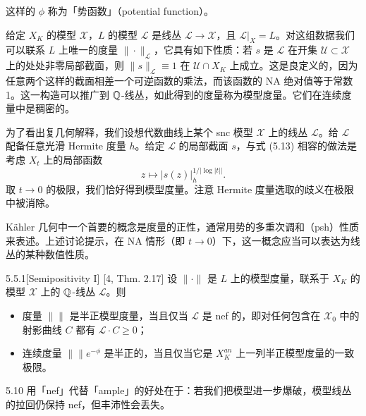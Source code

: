 这样的 $\phi$ 称为「势函数」（potential function）。

给定 $X_K$ 的模型 $\mathcal X$，$L$ 的模型 $\mathcal L$ 是线丛 $\mathcal L\to\mathcal X$，且 $\mathcal L|_X=L$。对这组数据我们可以联系 $L$ 上唯一的度量 $\|\cdot\|_{\mathcal L}$，它具有如下性质：若 $s$ 是 $\mathcal L$ 在开集 $\mathcal U\subset\mathcal X$ 上的处处非零局部截面，则 $\|s\|_{\mathcal L}\equiv 1$ 在 $\mathcal U\cap X_K$ 上成立。这是良定义的，因为任意两个这样的截面相差一个可逆函数的乘法，而该函数的 NA 绝对值等于常数 1。这一构造可以推广到 $\mathbb{Q}$-线丛，如此得到的度量称为模型度量。它们在连续度量中是稠密的。

为了看出复几何解释，我们设想代数曲线上某个 snc 模型 $\mathcal X$ 上的线丛 $\mathcal L$。给 $\mathcal L$ 配备任意光滑 Hermite 度量 $h$。给定 $\mathcal L$ 的局部截面 $s$，与式 (5.13) 相容的做法是考虑 $X_t$ 上的局部函数
\[
z\mapsto |s(z)|^{1/|\log|t||}_h.
\]
取 $t\to 0$ 的极限，我们恰好得到模型度量。注意 Hermite 度量选取的歧义在极限中被消除。


Kähler 几何中一个首要的概念是度量的正性，通常用势的多重次调和（psh）性质来表述。上述讨论提示，在 NA 情形（即 $t\to 0$）下，这一概念应当可以表达为线丛的某种数值性质。

\begin{definition}{5.5.1}[Semipositivity I]
[4, Thm. 2.17] 设 $\|\cdot\|$ 是 $L$ 上的模型度量，联系于 $X_K$ 的模型 $\mathcal X$ 上的 $\mathbb{Q}$-线丛 $\mathcal L$。则
\begin{itemize}
\item 度量 $\|\|$ 是半正模型度量，当且仅当 $\mathcal L$ 是 nef 的，即对任何包含在 $\mathcal X_0$ 中的射影曲线 $C$ 都有 $\mathcal L\cdot C\ge 0$；
\item 连续度量 $\|\|e^{-\phi}$ 是半正的，当且仅当它是 $X_K^{an}$ 上一列半正模型度量的一致极限。
\end{itemize}
\end{definition}

\begin{remark}{5.10}
用「nef」代替「ample」的好处在于：若我们把模型进一步爆破，模型线丛的拉回仍保持 nef，但丰沛性会丢失。
\end{remark}


